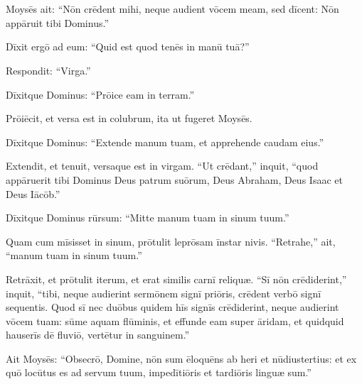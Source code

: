 \chapter{}

\thispagestyle{empty}

\vspace*{-1.0cm}

 Moysēs ait: ``Nōn crēdent mihi, neque audient vōcem meam, sed dīcent:
Nōn appāruit tibi Dominus.''

Dīxit ergō ad eum: ``Quid est quod tenēs in manū tuā?''

Respondit: ``Virga.''

Dīxitque Dominus: ``Prōice eam in terram.''

Prōiēcit, et versa est in colubrum, ita ut fugeret Moysēs. 

Dīxitque Dominus: ``Extende manum tuam, et apprehende caudam eius.''

Extendit, et tenuit, versaque est in virgam.
``Ut crēdant,'' inquit, ``quod appāruerit tibi Dominus Deus patrum suōrum,
Deus Abraham, Deus Isaac et Deus Iācōb.''

Dīxitque Dominus rūrsum: ``Mitte manum tuam in sinum tuum.''

Quam cum mīsisset in sinum, prōtulit leprōsam īnstar nivis.
``Retrahe,'' ait, ``manum tuam in sinum tuum.''

Retrāxit, et prōtulit iterum,
et erat similis carnī reliquæ.
``Sī nōn crēdiderint,'' inquit, ``tibi, neque audierint
sermōnem signī priōris, crēdent verbō signī sequentis. 
Quod sī nec duōbus quidem hīs signīs crēdiderint,
neque audierint vōcem tuam: sūme aquam flūminis,
et effunde eam super āridam, et quidquid hauserīs dē fluviō,
vertētur in sanguinem.''


Ait Moysēs: ``Obsecrō, Domine, nōn sum ēloquēns ab heri et
nūdiustertius: et ex quō locūtus es ad servum tuum,
impedītiōris et tardiōris linguæ sum.''

